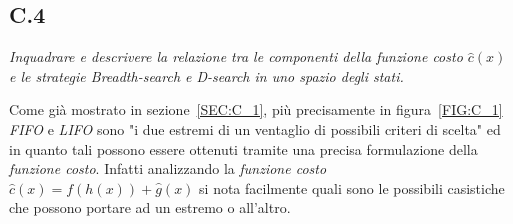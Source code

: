 \documentclass[a4paper]{article}
\begin{document}
\subsection{C.4}
\label{SEC:C4}
\emph{Inquadrare e descrivere la relazione tra le componenti della funzione costo  $\hat c (x)$ e le strategie Breadth-search e D-search in uno spazio degli stati.}


Come già mostrato in sezione~\ref{SEC:C_1}, più precisamente in figura~\ref{FIG:C_1} \textit{FIFO} e \textit{LIFO} sono "i due estremi di un ventaglio di possibili criteri di scelta" ed in quanto tali possono essere ottenuti tramite una precisa formulazione della \textit{funzione costo}.
Infatti analizzando la \textit{funzione costo} $\hat c(x) = f(h(x)) + \hat g(x)$ si nota facilmente quali sono le possibili casistiche che possono portare ad un estremo o all'altro.
\end{document}

